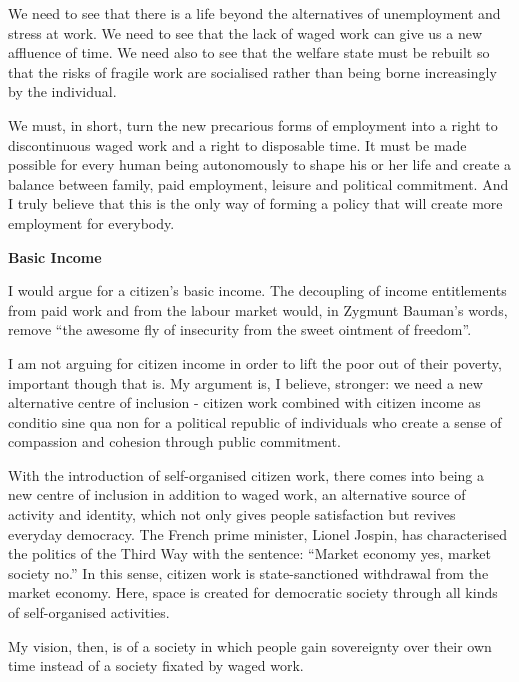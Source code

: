 \documentclass[
]{book}
\begin{document}
We need to see that there is a life beyond the alternatives of unemployment and stress at work. We need to see that the lack of waged work can give us a new affluence of time. We need also to see that the welfare state must be rebuilt so that the risks of fragile work are socialised rather than being borne increasingly by the individual.

We must, in short, turn the new precarious forms of employment into a right to discontinuous waged work and a right to disposable time. It must be made possible for every human being autonomously to shape his or her life and create a balance between family, paid employment, leisure and political commitment. And I truly believe that this is the only way of forming a policy that will create more employment for everybody.

\textbf{Basic Income}

I would argue for a citizen's basic income.
The decoupling of income entitlements from paid work and from the labour market would, in Zygmunt Bauman's words, remove ``the awesome fly of insecurity from the sweet ointment of freedom''.

I am not arguing for citizen income in order to lift the poor out of their poverty, important though that is. My argument is, I believe, stronger: we need a new alternative centre of inclusion - citizen work combined with citizen income as conditio sine qua non for a political republic of individuals who create a sense of compassion and cohesion through public commitment.

With the introduction of self-organised citizen work, there comes into being a new centre of inclusion in addition to waged work, an alternative source of activity and identity, which not only gives people satisfaction but revives everyday democracy.
The French prime minister, Lionel Jospin, has characterised the politics of the Third Way with the sentence: ``Market economy yes, market society no.'' In this sense, citizen work is state-sanctioned withdrawal from the market economy. Here, space is created for democratic society through all kinds of self-organised activities.

My vision, then, is of a society in which people gain sovereignty over their own time instead of a society fixated by waged work.
\end{document}
